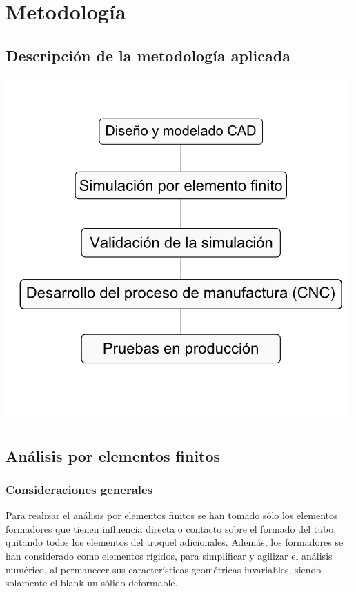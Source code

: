 \chapter{Metodología}

\section{Descripción de la metodología aplicada}

\begin{center}
\includegraphics[scale=0.75]{src/ch3/diagrama_metodologia.png}
\label{fig:diagrama_metodologia}
\end{center}

\section{Análisis por elementos finitos}

\subsection{Consideraciones generales}

Para realizar el análisis por elementos finitos se han tomado sólo los elementos formadores que 
tienen influencia directa o contacto sobre el formado del tubo, quitando todos los elementos 
del troquel adicionales. Además, los formadores se han considerado como elementos rígidos, 
para simplificar y agilizar el análisis numérico, al permanecer sus características geométricas 
invariables, siendo solamente el blank un sólido deformable.

